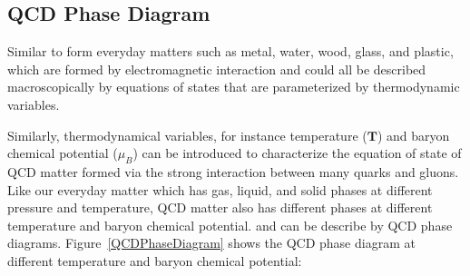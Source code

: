

\subsection{QCD Phase Diagram}

Similar to form everyday matters such as metal, water, wood, glass, and plastic, which are formed by electromagnetic interaction and could all be described macroscopically by equations of states that are parameterized by thermodynamic variables. 

Similarly, thermodynamical variables, for instance temperature ($\mathbf{T}$) and baryon chemical potential ($\mu_{B}$) can be introduced to characterize the equation of state of QCD matter formed via the strong interaction between many quarks and gluons. %
Like our everyday matter which has gas, liquid, and solid phases at different pressure and temperature, QCD matter also has different phases at different temperature and baryon chemical potential. and can be describe by QCD phase diagrams. Figure~\ref{QCDPhaseDiagram} shows the QCD phase diagram at different temperature and baryon chemical potential:

